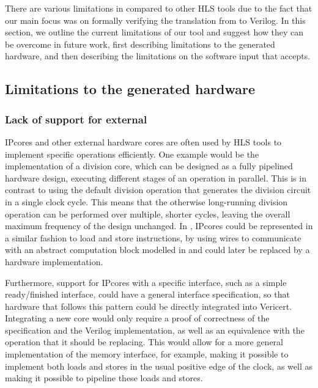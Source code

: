 There are various limitations in \vericert{} compared to other HLS tools due to
the fact that our main focus was on formally verifying the translation from
\rtl{} to Verilog.  In this section, we outline the current limitations of our
tool and suggest how they can be overcome in future work, first describing
limitations to the generated hardware, and then describing the limitations on
the software input that \vericert{} accepts.

\subsection{Limitations to the generated hardware}

\subsubsection{Lack of support for external }

\Glspl{IPcore} and other external hardware cores are often used by \gls{HLS}
tools to implement specific operations efficiently.  One example would be the
implementation of a division core, which can be designed as a fully pipelined
hardware design, executing different stages of an operation in parallel.  This
is in contrast to using the default division operation that generates the
division circuit in a single clock cycle.  This means that the otherwise
long-running division operation can be performed over multiple, shorter cycles,
leaving the overall maximum frequency of the design unchanged.  In \htl{},
\glspl{IPcore} could be represented in a similar fashion to load and store
instructions, by using wires to communicate with an abstract computation block
modelled in \htl{} and could later be replaced by a hardware implementation.

Furthermore, support for \glspl{IPcore} with a specific interface, such as a
simple ready/finished interface, could have a general interface specification,
so that hardware that follows this pattern could be directly integrated into
Vericert.  Integrating a new core would only require a proof of correctness of
the specification and the Verilog implementation, as well as an equivalence with
the operation that it should be replacing.  This would allow for a more general
implementation of the memory interface, for example, making it possible to
implement both loads and stores in the usual positive edge of the clock, as well
as making it possible to pipeline these loads and stores.

